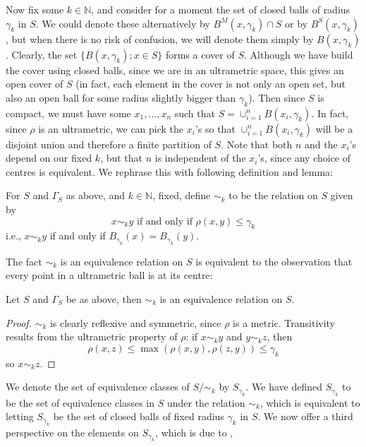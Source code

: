  Now fix some $k \in \mathbb{N}$, and consider for a moment the set of closed balls of radius $\gamma_k$ in $S$. We could denote these alternatively by $B^M(x, \gamma_k) \cap S$ or by  $B^S(x, \gamma_k)$, but when there is no risk of confusion, we will denote them simply by $B(x, \gamma_k)$. Clearly, the set  $\{B(x, \gamma_k); x \in S\}$ forms a cover of $S$. Although we have build the cover using closed balls, since we are in an ultrametric space, this gives an open cover of $S$ (in fact, each element in the cover is not only an open set, but also an open ball for some radius slightly bigger than $\gamma_k$). Then since $S$ is compact, we must have some $x_1,\ldots, x_n$  such that $S= \cup_{i=1}^n B(x_i, \gamma_k)$. In fact,  since $\rho$ is an ultrametric, we can pick the $x_i$'s so that $\cup_{i=1}^n B(x_i, \gamma_k)$ will be a disjoint union and therefore a finite partition of $S$. Note that both $n$ and the $x_i$'s depend on our fixed $k$, but that $n$ is independent of the $x_i$'s, since any choice of centres is equivalent. We rephrase this with following definition and lemma:\\

\begin{definition}
For $S$ and $\Gamma_S$ as above, and $k \in \mathbb{N}$, fixed,  define $\sim_k$ to  be the relation on $S$ given by \[x \sim_k y\text{ if and only if  }\rho(x,y) \leq \gamma_k\] i.e.,  $x \sim_k y$ if and only if $B_{\gamma_k}(x) = B_{\gamma_k}(y)$.
\end{definition}

The fact $\sim_k$ is an equivalence relation on $S$ is equivalent to the observation that every point in a ultrametric ball is at its centre:\\

\begin{lemma}
Let  $S$ and $\Gamma_S$ be as above, then $\sim_k$ is an equivalence relation on $S$.
\end{lemma}

\begin{proof}
$\sim_k$ is clearly reflexive and symmetric, since $\rho$ is a metric. Transitivity results from the ultrametric property of $\rho$: if $x \sim_k y$ and $y \sim_k z$, then $$\rho(x, z) \leq \max(\rho(x,y), \rho(z,y)) \leq \gamma_k$$ so $x \sim_k z$. 
\end{proof}

 We denote the set of equivalence classes of $S/\sim_k$ by $S_{\gamma_k}$. We have defined  $S_{\gamma_k}$ to be the set of equivalence classes in $S$ under the relation $\sim_k$, which is equivalent to letting $S_{\gamma_k}$ be the set of closed balls of fixed radius $\gamma_k$ in  $S$. We now offer a third perspective on the elements on $S_{\gamma_k}$, which is due to \cite{na},\\


